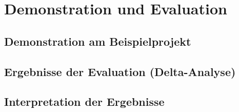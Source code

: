 \section{Demonstration und Evaluation}
\subsection{Demonstration am Beispielprojekt}
\subsection{Ergebnisse der Evaluation (Delta-Analyse)}
\subsection{Interpretation der Ergebnisse}